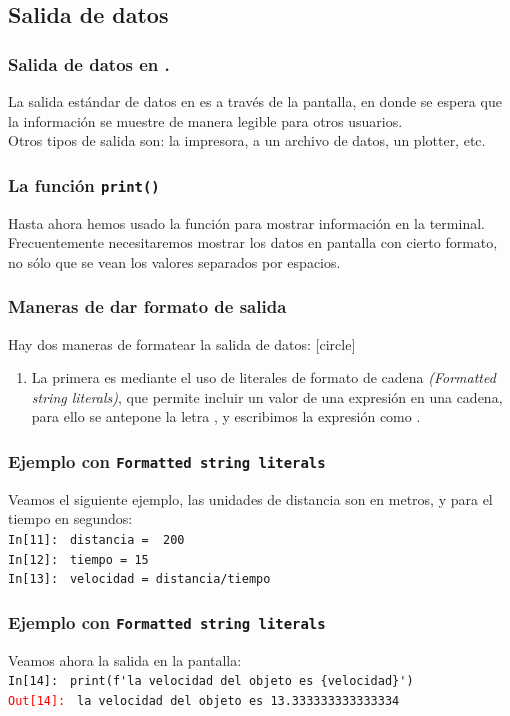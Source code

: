 \subsection{Salida de datos}
\begin{frame}
\frametitle{Salida de datos en \python.}
La salida estándar de datos en \python{} es a través de la pantalla, en donde se espera que la información se muestre de manera legible para otros usuarios.
\\
\bigskip
Otros tipos de salida son: la impresora, a un archivo de datos, un plotter, etc.
\end{frame}
\begin{frame}
\frametitle{La función \texttt{print()}}
Hasta ahora hemos usado la función  para mostrar información en la terminal.
\\
\bigskip
Frecuentemente necesitaremos mostrar los datos en pantalla con cierto formato, no sólo que se vean los valores separados por espacios.
\end{frame}
\begin{frame}
\frametitle{Maneras de dar formato de salida}
Hay dos maneras de formatear la salida de datos:
[circle]
\begin{enumerate}[<+->]
\item La primera es mediante el uso de literales de formato de cadena \emph{(Formatted string literals)}, que permite incluir un valor de una expresión en una cadena, para ello se antepone la letra , y escribimos la expresión como .
\end{enumerate}
\end{frame}
\begin{frame}[fragile]
\frametitle{Ejemplo con \texttt{Formatted string literals}}
Veamos el siguiente ejemplo, las unidades de distancia son en metros, y para el tiempo en segundos:
\\
\bigskip
\pause
\textcolor{ao}{\texttt{In[11]: }} \verb|distancia =  200|
\\
\pause
\textcolor{ao}{\texttt{In[12]: }} \verb|tiempo = 15|
\\
\pause
\textcolor{ao}{\texttt{In[13]: }} \verb|velocidad = distancia/tiempo|
\end{frame}
\begin{frame}[fragile]
\frametitle{Ejemplo con \texttt{Formatted string literals}}
Veamos ahora la salida en la pantalla:
\\
\bigskip
\pause
\fontsize{13}{13}\selectfont
\textcolor{ao}{\texttt{In[14]: }} \verb|print(f'la velocidad del objeto es {velocidad}')|
\\
\pause
\textcolor{red}{\texttt{Out[14]: }} \verb|la velocidad del objeto es 13.333333333333334|
\end{frame}
